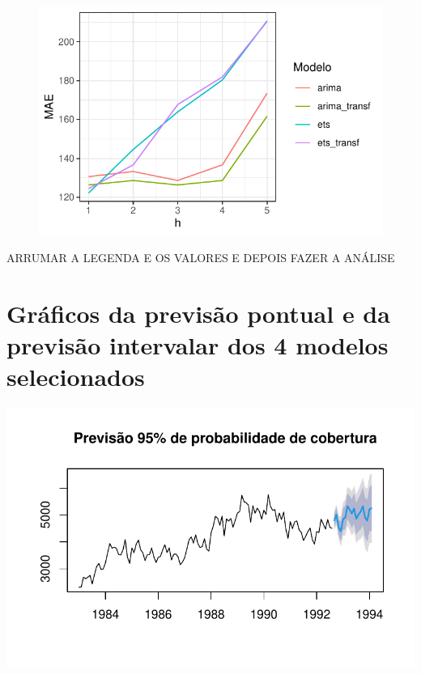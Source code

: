 \documentclass[
  letterpaper,
  DIV=11,
  numbers=noendperiod]{scrartcl}
\begin{document}
\begin{figure}

{\centering \includegraphics{T2_grupo5_files/figure-pdf/performance-1.pdf}

}

\end{figure}

ARRUMAR A LEGENDA E OS VALORES E DEPOIS FAZER A ANÁLISE

\hypertarget{gruxe1ficos-da-previsuxe3o-pontual-e-da-previsuxe3o-intervalar-dos-4-modelos-selecionados}{%
\section{Gráficos da previsão pontual e da previsão intervalar dos 4
modelos
selecionados}\label{gruxe1ficos-da-previsuxe3o-pontual-e-da-previsuxe3o-intervalar-dos-4-modelos-selecionados}}

\includegraphics{T2_grupo5_files/figure-pdf/previsao-pontual-1.pdf}
\end{document}
